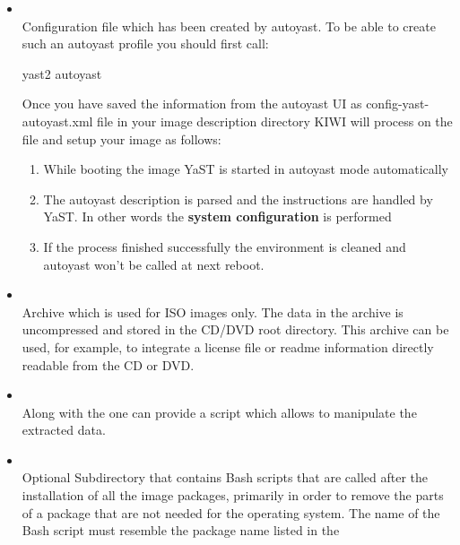 \begin{itemize}
\item {}\\
      Configuration file which has been created by autoyast.
      To be able to create such an autoyast profile you should first
      call:

\begin{Command}{8cm}
yast2 autoyast
\end{Command}

      Once you have saved the information from the autoyast UI as
      config-yast-autoyast.xml file in your image description directory KIWI
      will process on the file and setup your image as follows:
      \begin{enumerate}
      \item While booting the image YaST is started in autoyast mode
            automatically
      \item The autoyast description is parsed and the instructions are
            handled by YaST. In other words the \textbf{system configuration}
            is performed
      \item If the process finished successfully the environment is
            cleaned and autoyast won't be called at next reboot.
      \end{enumerate}

\item {}\\
      Archive which is used for ISO images only. The data in the archive is
      uncompressed and stored in the CD/DVD root directory. This
      archive can be used, for example, to integrate a license file or
      readme information directly readable from the CD or DVD.

\item {}\\
      Along with the  one can provide a script which allows
      to manipulate the extracted data.

\item {}\\
      Optional Subdirectory that contains Bash scripts that are called
      after the installation of all the image packages, primarily in order
      to remove the parts of a package that are not needed for the operating
      system. The name of the Bash script must resemble the package name
      listed in the 
\end{itemize}

